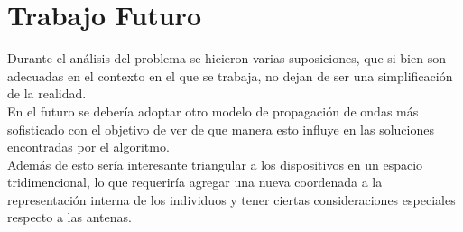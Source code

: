 \documentclass[journal]{IEEEtran}
\begin{document}

\section{Trabajo Futuro}

Durante el análisis del problema se hicieron varias suposiciones, que si bien son adecuadas en el contexto en el que se trabaja, no dejan de ser una simplificación de la realidad.\\

En el futuro se debería adoptar otro modelo de propagación de ondas más sofisticado con el objetivo de ver de que manera esto influye en las soluciones encontradas por el algoritmo.\\

Además de esto sería interesante triangular a los dispositivos en un espacio tridimencional, lo que requeriría agregar una nueva coordenada a la representación interna de los individuos y tener ciertas consideraciones especiales respecto a las antenas.

\newpage



%
%
%









\end{document}
